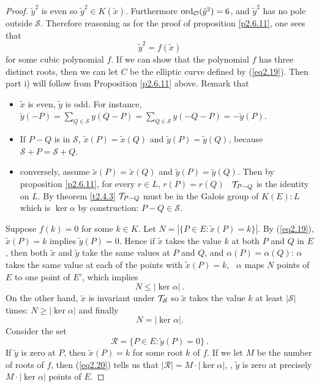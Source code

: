 \begin{proof}
$\tilde{y}^{2}$ is even so $\tilde{y}^{2}\in K(\tilde{x})$. Furthermore $\operatorname{ord}_{\mathcal{O}}(\tilde{y}^{2})=6$, and $\tilde{y}^{2}$ has no pole outside $\mathcal{S}$. Therefore reasoning as for the proof of proposition \ref{p2.6.11}, one sees that
\begin{equation}
\label{eq2.19}
\tilde{y}^{2}=f(\tilde{x})
\end{equation}
for some cubic polynomial $f$. If we can show that the polynomial $f$ has three distinct roots, then we can let $C$ be the elliptic curve defined by (\ref{eq2.19}). Then part i) will follow from Proposition \ref{p2.6.11} above. Remark that 
\begin{itemize}
\item
$\tilde{x}$ is even, $\tilde{y}$ is odd. For instance, $\tilde{y}(-P)=\sum_{Q\in \mathcal{S}} y(Q-P) = \sum_{Q\in \mathcal{S}} y(-Q-P) = -\tilde{y}(P)$.
\item
If $P-Q$ is in $\mathcal{S}$, $\tilde{x}(P) =\tilde{x}(Q)$ and $\tilde{y}(P) =\tilde{y}(Q)$, because $\mathcal{S}+P=\mathcal{S}+Q$.
\item
conversely, assume $\tilde{x}(P) =\tilde{x}(Q)$ and $\tilde{y}(P) =\tilde{y}(Q)$. Then by proposition \ref{p2.6.11}, for every $r\in L$, $r(P)=r(Q)$ \ie\ $\mathcal{T}_{P-Q}$ is the identity on $L$. By theorem \ref{t2.4.3} $\mathcal{T}_{P-Q}$ must be in the Galois group of $K(E):L$ which is $\ker \alpha$ by construction: $P-Q \in \mathcal{S}$.
\end{itemize}




\bigskip
Suppose $f(k)=0$ for some $k\in K$. Let $N=|\{P\in E:\tilde{x}(P)=k\}|$. By (\ref{eq2.19}), $\tilde{x}(P)=k$ implies $\tilde{y}(P)=0$.
Hence if $\tilde{x}$ takes the value $k$ at both $P$ and $Q$ in $E$, then both $\tilde{x}$ and $\tilde{y}$ take the same values at $P$ and $Q$, and $\alpha(P)=\alpha(Q)$: $\alpha$ takes the same value at each of the points with $\tilde{x}(P)=k$, \ie\ $\alpha$ maps $N$ points of $E$ to one point of $E'$, which implies
$$
N\leq|\ker  \alpha|\ .
$$
On the other hand, $\tilde{x}$ is invariant under $\mathcal{T}_{\mathcal{S}}$ so $\tilde{x}$ takes the value $k$ at least $|\mathcal{S}|$ times: $N\geq|\ker \alpha|$ and finally
\begin{equation}
\label{eq2.20}
N=|\ker \alpha| .
\end{equation}
Consider the set
$$
\mathcal{R}=\{P\in E:\tilde{y}(P)=0\}\ .
$$
If $\tilde{y}$ is zero at $P$, then $\tilde{x}(P)=k$ for some root $k$ of $f$. If we let $M$ be the number of roots of $f$, then (\ref{eq2.20}) tells us that $|\mathcal{R}|=M\cdot|\ker \alpha|$, \ie, $\tilde{y}$ is zero at precisely $M\cdot|\ker \alpha|$ points of $E$.


\end{proof}
